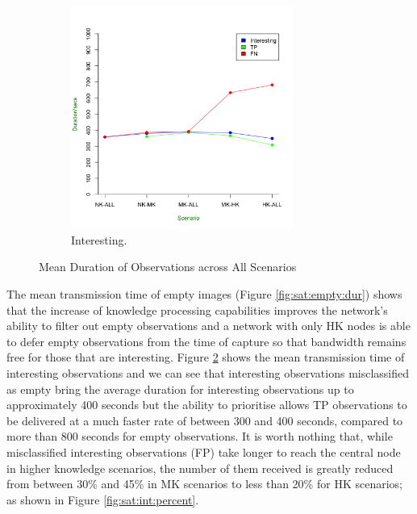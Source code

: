 \begin{figure}[ht!]
		\begin{subfigure}{0.7\textwidth}
		\includegraphics[width=0.8\textwidth]{Chap7/figures/saturated/all_int}
		\caption{Interesting.}
		\label{fig:sat:int:dur}
		\end{subfigure}
	\caption{Mean Duration of Observations across All Scenarios}
	\end{figure}

The mean transmission time of empty images (Figure \ref{fig:sat:empty:dur}) shows that the increase of knowledge processing capabilities improves the network's ability to filter out empty observations and a network with only HK nodes is able to defer empty observations from the time of capture so that bandwidth remains free for those that are interesting. Figure \ref{fig:sat:int:dur} shows the mean transmission time of interesting observations and we can see that interesting observations misclassified as empty bring the average duration for interesting observations up to approximately 400 seconds but the ability to prioritise allows TP observations to be delivered at a much faster rate of between 300 and 400 seconds, compared to more than 800 seconds for empty observations. It is worth nothing that, while misclassified interesting observations (FP) take longer to reach the central node in higher knowledge scenarios, the number of them received is greatly reduced from between 30\% and 45\% in MK scenarios to less than 20\% for HK scenarios; as shown in Figure \ref{fig:sat:int:percent}.

